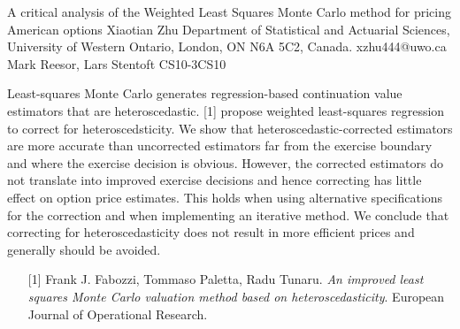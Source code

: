 \begin{talk}
  {A critical analysis of the Weighted Least Squares Monte Carlo method for pricing American options}%
  {Xiaotian Zhu}%
  {Department of Statistical and Actuarial Sciences, University of Western Ontario, London, ON N6A 5C2, Canada. }%
  {xzhu444@uwo.ca}%
  {Mark Reesor,  Lars Stentoft}%
{}{}{CS10-3}{CS10}

			
Least-squares Monte Carlo generates regression-based continuation value estimators that are heteroscedastic. [1] propose weighted least-squares regression to correct for heteroscedsticity. We show that heteroscedastic-corrected estimators are more accurate than uncorrected estimators far from the exercise boundary and where the exercise decision is obvious. However, the corrected estimators do not translate into improved exercise decisions and hence correcting has little effect on option price estimates. This holds when using alternative specifications for the correction and when implementing an iterative method. We conclude that correcting for heteroscedasticity does not result in more efficient prices and generally should be avoided.

\medskip


\begin{enumerate}
	\item[{[1]}] Frank J. Fabozzi, Tommaso Paletta, Radu Tunaru. {\it An improved least squares Monte Carlo valuation method based on heteroscedasticity}. European Journal of Operational Research.
\end{enumerate}

\end{talk}

